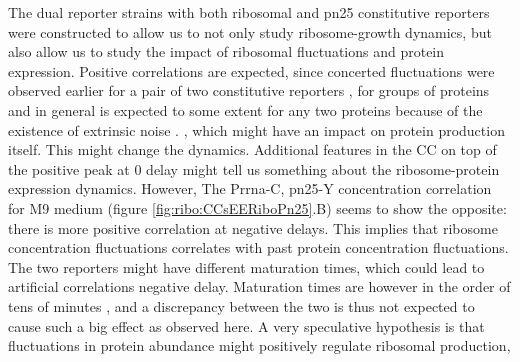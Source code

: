 The dual reporter strains with both ribosomal and pn25 constitutive reporters were constructed to allow us to not only study ribosome-growth dynamics, but also allow us to study the impact of ribosomal fluctuations and protein expression.
%
%
Positive correlations are expected, since concerted fluctuations were observed earlier for a pair of two constitutive reporters \cite{Elowitz2002}, for groups of proteins \cite{Stewart-Ornstein2012} and in general is expected to some extent for any two proteins because of the existence of extrinsic noise \cite{Chalancon2012}.
%
, which might have an impact on protein production itself.
This might change the dynamics.
%
Additional features in the CC on top of the positive peak at 0 delay might tell us something about the ribosome-protein expression dynamics.
%
%
However, The Prrna-C, pn25-Y concentration correlation for M9 medium (figure \ref{fig:ribo:CCsEERiboPn25}.B) seems to show the opposite: there is more positive correlation at negative delays.
This implies that ribosome concentration fluctuations correlates with past protein concentration fluctuations.
%
The two reporters might have different maturation times, which could lead to artificial correlations negative delay.
%
Maturation times are however in the order of tens of minutes \cite{Iizuka2011, Walker2016t}, and a discrepancy between the two is thus not expected to cause such a big effect as observed here.
%
A very speculative hypothesis is that 
fluctuations in protein abundance might positively regulate ribosomal production,


